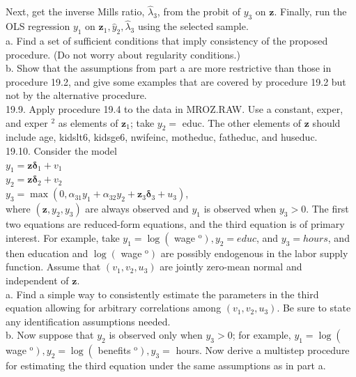 \documentclass[10pt]{article}
\begin{document}
Next, get the inverse Mills ratio, $\hat{\lambda}_{3}$, from the probit of $y_{3}$ on $\mathbf{z}$. Finally, run the OLS regression $y_{1}$ on $\mathbf{z}_{1}, \hat{y}_{2}, \hat{\lambda}_{3}$ using the selected sample.\\
a. Find a set of sufficient conditions that imply consistency of the proposed procedure. (Do not worry about regularity conditions.)\\
b. Show that the assumptions from part a are more restrictive than those in procedure 19.2, and give some examples that are covered by procedure 19.2 but not by the alternative procedure.\\
19.9. Apply procedure 19.4 to the data in MROZ.RAW. Use a constant, exper, and exper $^{2}$ as elements of $\mathbf{z}_{1}$; take $y_{2}=$ educ. The other elements of $\mathbf{z}$ should include age, kidslt6, kidsge6, nwifeinc, motheduc, fatheduc, and huseduc.\\
19.10. Consider the model\\
$y_{1}=\mathbf{z} \boldsymbol{\delta}_{1}+v_{1}$\\
$y_{2}=\mathbf{z} \boldsymbol{\delta}_{2}+v_{2}$\\
$y_{3}=\max \left(0, \alpha_{31} y_{1}+\alpha_{32} y_{2}+\mathbf{z}_{3} \boldsymbol{\delta}_{3}+u_{3}\right)$,\\
where $\left(\mathbf{z}, y_{2}, y_{3}\right)$ are always observed and $y_{1}$ is observed when $y_{3}>0$. The first two equations are reduced-form equations, and the third equation is of primary interest. For example, take $y_{1}=\log \left(\right.$ wage $\left.^{\mathrm{o}}\right), y_{2}=e d u c$, and $y_{3}=h o u r s$, and then education and $\log \left(\right.$ wage $\left.^{\mathrm{o}}\right)$ are possibly endogenous in the labor supply function. Assume that $\left(v_{1}, v_{2}, u_{3}\right)$ are jointly zero-mean normal and independent of $\mathbf{z}$.\\
a. Find a simple way to consistently estimate the parameters in the third equation allowing for arbitrary correlations among $\left(v_{1}, v_{2}, u_{3}\right)$. Be sure to state any identification assumptions needed.\\
b. Now suppose that $y_{2}$ is observed only when $y_{3}>0$; for example, $y_{1}= \log \left(\right.$ wage $\left.^{\mathrm{o}}\right), y_{2}=\log \left(\right.$ benefits $\left.^{\mathrm{o}}\right), y_{3}=$ hours. Now derive a multistep procedure for estimating the third equation under the same assumptions as in part a.\\
\end{document}
